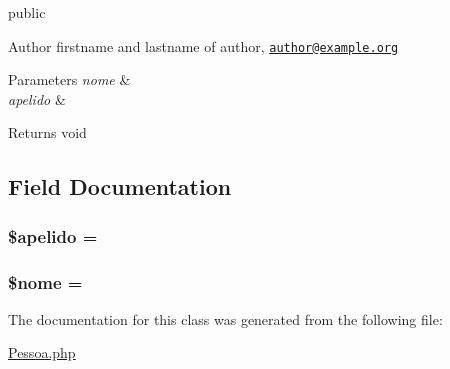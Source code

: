 public \begin{DoxyAuthor}{Author}
firstname and lastname of author, \href{mailto:author@example.org}{\tt author@example.\+org} 
\end{DoxyAuthor}

\begin{DoxyParams}{Parameters}
{\em nome} & \\
\hline
{\em apelido} & \\
\hline
\end{DoxyParams}
\begin{DoxyReturn}{Returns}
void 
\end{DoxyReturn}


\subsection{Field Documentation}
\hypertarget{class_pessoa_ade15c5813816830ad2d6af1f066b8b03}{}
\subsubsection[{\$apelido}]{\setlength{\rightskip}{0pt plus 5cm}\$apelido = \textquotesingle{}\textquotesingle{}}\label{class_pessoa_ade15c5813816830ad2d6af1f066b8b03}
\hypertarget{class_pessoa_ac8c9d9dd5d90fa5854f0cb8397084ebd}{}
\subsubsection[{\$nome}]{\setlength{\rightskip}{0pt plus 5cm}\$nome = \textquotesingle{}\textquotesingle{}}\label{class_pessoa_ac8c9d9dd5d90fa5854f0cb8397084ebd}


The documentation for this class was generated from the following file\+:\begin{DoxyCompactItemize}
\item 
\hyperlink{_pessoa_8php}{Pessoa.\+php}\end{DoxyCompactItemize}
